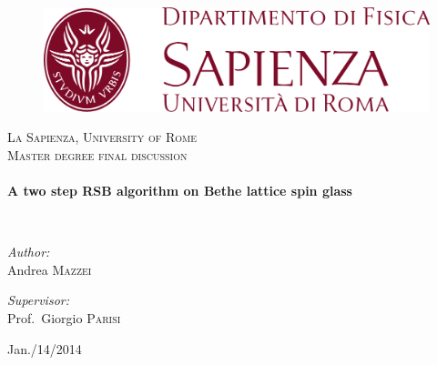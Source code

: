 \begin{titlepage}
\begin{center}

\begin{figure}

\centerline{\includegraphics{img/dip-logo-uff.png}}
\end{figure}

\textsc{\LARGE La Sapienza, University of Rome}\\[1.5cm]

\textsc{\Large Master degree final discussion}\\[0.5cm]

\HRule \\[0.4cm]
{ \huge \bfseries A two step RSB algorithm on Bethe lattice spin glass\\[0.4cm] }

\HRule \\[1.5cm]

\begin{minipage}{0.4\textwidth}
\begin{flushleft} \large
\emph{Author:}\\
Andrea \textsc{Mazzei}
\end{flushleft}
\end{minipage}
\begin{minipage}{0.4\textwidth}
\begin{flushright} \large
\emph{Supervisor:} \\
Prof.~Giorgio \textsc{Parisi}
\end{flushright}

\end{minipage}


\date{\large \today}
\vspace{10 cm}
Jan./14/2014
\vfill

\end{center}
\end{titlepage} 